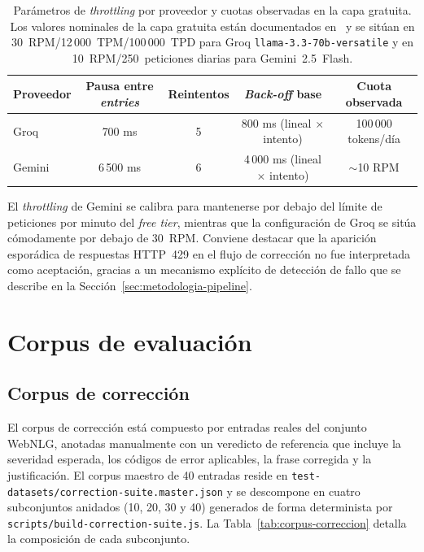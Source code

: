\begin{table}[ht]
	\centering
	\small
	\begin{tabular}{lcccc}
		\hline
		\textbf{Proveedor} & \textbf{Pausa entre \textit{entries}} & \textbf{Reintentos} & \textbf{\textit{Back-off} base}     & \textbf{Cuota observada} \\
		\hline
		Groq               & 700 ms                                & 5                   & 800 ms (lineal $\times$ intento)    & 100\,000 tokens/día      \\
		Gemini             & 6\,500 ms                             & 6                   & 4\,000 ms (lineal $\times$ intento) & $\sim$10 RPM             \\
		\hline
	\end{tabular}
	\caption{Parámetros de \textit{throttling} por proveedor y cuotas observadas
		en la capa gratuita. Los valores nominales de la capa gratuita están
		documentados en~\cite{GroqRateLimits,GoogleAIRateLimits} y se sitúan en
		30~RPM/12\,000~TPM/100\,000~TPD para Groq \texttt{llama-3.3-70b-versatile} y
		en 10~RPM/250~peticiones diarias para Gemini~2.5~Flash.}
	\label{tab:throttling}
\end{table}

El \textit{throttling} de Gemini se calibra para mantenerse por debajo del
límite de peticiones por minuto del \textit{free tier}, mientras que la
configuración de Groq se sitúa cómodamente por debajo de 30~RPM. Conviene
destacar que la aparición esporádica de respuestas HTTP~429 en el flujo de
corrección no fue interpretada como aceptación, gracias a un mecanismo
explícito de detección de fallo que se describe en la
Sección~\ref{sec:metodologia-pipeline}.

\section{Corpus de evaluación}

\subsection{Corpus de corrección}

El corpus de corrección está compuesto por entradas reales del conjunto WebNLG,
anotadas manualmente con un veredicto de referencia que incluye la severidad
esperada, los códigos de error aplicables, la frase corregida y la
justificación. El corpus maestro de 40 entradas reside en
\texttt{test-datasets/correction-suite.master.json} y se descompone en cuatro
subconjuntos anidados (10, 20, 30 y 40) generados de forma determinista por
\texttt{scripts/build-correction-suite.js}. La
Tabla~\ref{tab:corpus-correccion} detalla la composición de cada subconjunto.

